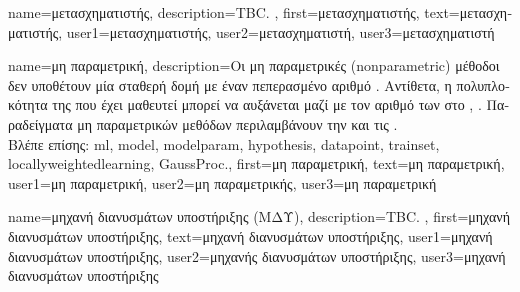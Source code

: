 {name={\foreignlanguage{greek}{μετασχηματιστής}},
	description={TBC. }, 
 	first={\foreignlanguage{greek}{μετασχηματιστής}}, 
 	text={\foreignlanguage{greek}{μετασχηματιστής}},
	user1={\foreignlanguage{greek}{μετασχηματιστής}}, %
	user2={\foreignlanguage{greek}{μετασχηματιστή}}, %
	user3={\foreignlanguage{greek}{μετασχηματιστή}} %
}

{name={\foreignlanguage{greek}{μη παραμετρική}}, 
	description={\foreignlanguage{greek}{Οι μη παραμετρικές} (nonparametric) 
		\foreignlanguage{greek}{μέθοδοι}  \foreignlanguage{greek}{δεν υποθέτουν μία σταθερή δομή}  
		 \foreignlanguage{greek}{με έναν πεπερασμένο αριθμό} . \foreignlanguage{greek}{Αντίθετα, 
		η πολυπλοκότητα της}  \foreignlanguage{greek}{που έχει μαθευτεί μπορεί να αυξάνεται μαζί με τον αριθμό των} 
		 \foreignlanguage{greek}{στο}  \cite{MLBasics}, \cite{BishopBook}. 
		\foreignlanguage{greek}{Παραδείγματα μη παραμετρικών μεθόδων}  \foreignlanguage{greek}{περιλαμβάνουν την} 
		 \foreignlanguage{greek}{και τις} . 
				\\
		\foreignlanguage{greek}{Βλέπε επίσης:} \gls{ml}, \gls{model}, \gls{modelparam}, \gls{hypothesis}, \gls{datapoint}, 
		\gls{trainset}, \gls{locallyweightedlearning}, \gls{GaussProc}.}, 
	first={\foreignlanguage{greek}{μη παραμετρική}},
	text={\foreignlanguage{greek}{μη παραμετρική}},
	user1={\foreignlanguage{greek}{μη παραμετρική}}, %
	user2={\foreignlanguage{greek}{μη παραμετρικής}}, %
	user3={\foreignlanguage{greek}{μη παραμετρική}} %
}

{name={\foreignlanguage{greek}{μηχανή διανυσμάτων υποστήριξης (ΜΔΥ)}}, 
	description={TBC. },
	first={\foreignlanguage{greek}{μηχανή διανυσμάτων υποστήριξης}},
	text={\foreignlanguage{greek}{μηχανή διανυσμάτων υποστήριξης}},
	user1={\foreignlanguage{greek}{μηχανή διανυσμάτων υποστήριξης}}, %
	user2={\foreignlanguage{greek}{μηχανής διανυσμάτων υποστήριξης}}, %
	user3={\foreignlanguage{greek}{μηχανή διανυσμάτων υποστήριξης}} %
}

